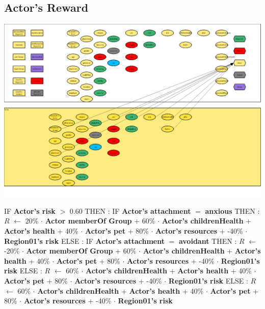 \documentclass{article}%
\begin{document}
\subsection{Actor's Reward}%
\label{subsec:Actor's Reward}%
\includegraphics[width=\textwidth]{images/Actor.png}%
\begin{flushleft}%
IF %
\textbf{Actor's risk}%
$>$%
0.60%
\linebreak%
\hspace*{2em}%
THEN %
: %
IF %
\textbf{Actor's attachment}%
$=$%
\textbf{anxious}%
\linebreak%
\hspace*{4em}%
THEN %
: %
$R$%
$\leftarrow$%
20\%%
$\cdot$%
\textbf{Actor memberOf Group}%
+%
60\%%
$\cdot$%
\textbf{Actor's childrenHealth}%
+%
\textbf{Actor's health}%
+%
40\%%
$\cdot$%
\textbf{Actor's pet}%
+%
80\%%
$\cdot$%
\textbf{Actor's resources}%
+%
{-}40\%%
$\cdot$%
\textbf{Region01's risk}%
\linebreak%
\hspace*{4em}%
ELSE %
: %
IF %
\textbf{Actor's attachment}%
$=$%
\textbf{avoidant}%
\linebreak%
\hspace*{6em}%
THEN %
: %
$R$%
$\leftarrow$%
{-}20\%%
$\cdot$%
\textbf{Actor memberOf Group}%
+%
60\%%
$\cdot$%
\textbf{Actor's childrenHealth}%
+%
\textbf{Actor's health}%
+%
40\%%
$\cdot$%
\textbf{Actor's pet}%
+%
80\%%
$\cdot$%
\textbf{Actor's resources}%
+%
{-}40\%%
$\cdot$%
\textbf{Region01's risk}%
\linebreak%
\hspace*{6em}%
ELSE %
: %
$R$%
$\leftarrow$%
60\%%
$\cdot$%
\textbf{Actor's childrenHealth}%
+%
\textbf{Actor's health}%
+%
40\%%
$\cdot$%
\textbf{Actor's pet}%
+%
80\%%
$\cdot$%
\textbf{Actor's resources}%
+%
{-}40\%%
$\cdot$%
\textbf{Region01's risk}%
\linebreak%
\hspace*{2em}%
ELSE %
: %
$R$%
$\leftarrow$%
60\%%
$\cdot$%
\textbf{Actor's childrenHealth}%
+%
\textbf{Actor's health}%
+%
40\%%
$\cdot$%
\textbf{Actor's pet}%
+%
80\%%
$\cdot$%
\textbf{Actor's resources}%
+%
{-}40\%%
$\cdot$%
\textbf{Region01's risk}%
\end{flushleft}
\end{document}
